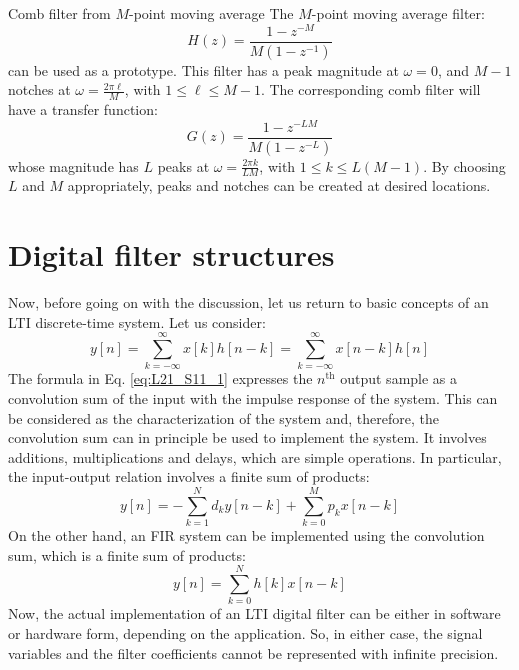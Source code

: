 \documentclass[../../main/main.tex]{subfiles}
\begin{document}
\begin{example}{\boldmath Comb filter from \( M \)-point moving average}{}
    The \( M \)-point moving average filter:
    \begin{equation}
        H(z)
        =
        \frac{1 - z^{-M}}{M(1 - z^{-1})}
        \label{eq:L21_S09_1}
    \end{equation}
    can be used as a prototype. This filter has a peak magnitude at \( \omega = 0 \), and \( M-1 \) notches at \( \omega = \frac{2\pi\ell}{M} \), with \( 1 \le \ell \le M-1 \). The corresponding comb filter will have a transfer function:
    \begin{equation}
        G(z)
        =
        \frac{1 - z^{-LM}}{M(1 - z^{-L})}
        \label{eq:L21_S10_1}
    \end{equation}
    whose magnitude has \( L \) peaks at \( \omega = \frac{2\pi k}{LM} \), with \( 1 \le k \le L(M-1) \). By choosing \( L \) and \( M \) appropriately, peaks and notches can be created at desired locations.
\end{example}





\section{Digital filter structures}
Now, before going on with the discussion, let us return to basic concepts of an LTI discrete-time system. Let us consider:
\begin{equation}
    y[n]
    =
    \sum_{k=-\infty}^{\infty} x[k]h[n-k]
    =
    \sum_{k=-\infty}^{\infty} x[n-k]h[n]
    \label{eq:L21_S11_1}
\end{equation}
The formula in Eq. \ref{eq:L21_S11_1} expresses the \( n^{\text{th}} \) output sample as a convolution sum of the input with the impulse response of the system. This can be considered as the characterization of the system and, therefore, the convolution sum can in principle be used to implement the system. It involves additions, multiplications and delays, which are simple operations. In particular, the input-output relation involves a finite sum of products:
\begin{equation}
    y[n]
    =
    - \sum_{k=1}^{N} d_{k}y[n-k] + \sum_{k=0}^{M} p_{k}x[n-k]
    \label{eq:L21_S12_1}
\end{equation}
On the other hand, an FIR system can be implemented using the convolution sum, which is a finite sum of products:
\begin{equation}
    y[n]
    =
    \sum_{k=0}^{N} h[k]x[n-k]
    \label{eq:L21_S12_2}
\end{equation}
Now, the actual implementation of an LTI digital filter can be either in software or hardware form, depending on the application. So, in either case, the signal variables and the filter coefficients cannot be represented with infinite precision.
\end{document}
